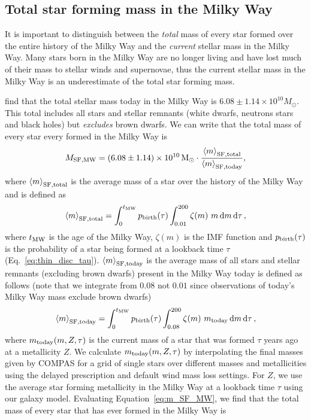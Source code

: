 \subsection{Total star forming mass in the Milky Way}
It is important to distinguish between the \textit{total} mass of every star formed over the entire history of the Milky Way and the \textit{current} stellar mass in the Milky Way. Many stars born in the Milky Way are no longer living and have lost much of their mass to stellar winds and supernovae, thus the current stellar mass in the Milky Way is an underestimate of the total star forming mass.

\citet{Licquia+2015} find that the total stellar mass today in the Milky Way is $6.08 \pm 1.14 \times 10^{10} \unit{M_{\odot}}$. This total includes all stars and stellar remnants (white dwarfs, neutrons stars and black holes) but \textit{excludes} brown dwarfs. We can write that the total mass of every star every formed in the Milky Way is
\begin{equation}\label{eq:m_SF_MW}
    M_{\rm SF, MW} = (6.08 \pm 1.14) \times 10^{10} \unit{M_{\rm \odot}} \cdot \frac{\avg{m}_{\rm SF, total}}{\avg{m}_{\rm SF, today}},
\end{equation}
where $\left\langle m\right\rangle_{\rm SF, total}$ is the average mass of a star over the history of the Milky Way and is defined as
\begin{equation}
    \avg{m}_{\rm SF, total} = \int_{0}^{t_{\rm MW}} p_{\rm birth}(\tau) \int_{0.01}^{200} \zeta(m)\ m \dd{m} \dd{\tau},
\end{equation}
where $t_{\rm MW}$ is the age of the Milky Way, $\zeta(m)$ is the \citet{Kroupa+2001} IMF function and $p_{\rm birth}(\tau)$ is the probability of a star being formed at a lookback time $\tau$ (Eq.~\ref{eq:thin_disc_tau}). $\left\langle m\right\rangle_{\rm SF, today}$ is the average mass of all stars and stellar remnants (excluding brown dwarfs) present in the Milky Way today is defined as follows (note that we integrate from $0.08$ not $0.01$ since observations of today's Milky Way mass exclude brown dwarfs)
\begin{equation}
    \avg{m}_{\rm SF, today} = \int_{0}^{t_{\rm MW}} p_{\rm birth}(\tau) \int_{0.08}^{200} \zeta(m)\ m_{\rm today} \dd{m} \dd{\tau},
\end{equation}
where $m_{\rm today}(m, Z, \tau)$ is the current mass of a star that was formed $\tau$ years ago at a metallicity $Z$. We calculate $m_{\rm today}(m, Z, \tau)$ by interpolating the final masses given by COMPAS for a grid of single stars over different masses and metallicities using the \citet{Fryer+2012} delayed prescription and default wind mass loss settings. For $Z$, we use the average star forming metallicity in the Milky Way at a lookback time $\tau$ using our galaxy model. Evaluating Equation~\ref{eq:m_SF_MW}, we find that the total mass of every star that has ever formed in the Milky Way is
